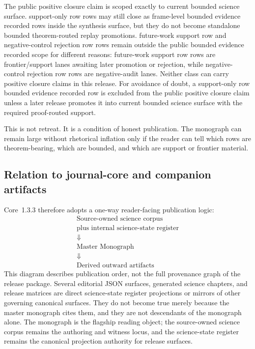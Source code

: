 The public positive closure claim is scoped exactly to
current bounded science surface. support-only row rows may still close as
frame-level bounded evidence recorded rows inside the synthesis surface, but they do not become
standalone bounded theorem-routed replay promotions. future-work support row and
negative-control rejection row rows remain outside the public bounded evidence recorded scope for different
reasons: future-work support row rows are frontier/support lanes awaiting later
promotion or rejection, while negative-control rejection row rows are negative-audit lanes.
Neither class can carry positive closure claims in this release.
For avoidance of doubt, a support-only row bounded evidence recorded row is excluded
from the public positive closure claim unless a later release promotes it into
current bounded science surface with the required proof-routed support.

This is not retreat. It is a condition of honest publication. The monograph
can remain large without rhetorical inflation only if the reader can tell which
rows are theorem-bearing, which are bounded, and which are support or frontier
material.

\subsection{Relation to journal-core and companion artifacts}

Core~1.3.3 therefore adopts a one-way reader-facing publication logic:
\[
\begin{gathered}
\text{Source-owned science corpus}\\
\text{plus internal science-state register}\\
\Downarrow\\
\text{Master Monograph}\\
\Downarrow\\
\text{Derived outward artifacts}
\end{gathered}
\]
This diagram describes publication order, not the full provenance graph of
the release package. Several editorial JSON surfaces, generated science
chapters, and release matrices are direct science-state register projections or mirrors of other
governing canonical surfaces. They do not become true merely because the
master monograph cites them, and they are not descendants of the monograph
alone. The monograph is the flagship reading object; the source-owned science
corpus remains the authoring and witness locus, and the science-state register remains the canonical
projection authority for release surfaces.

